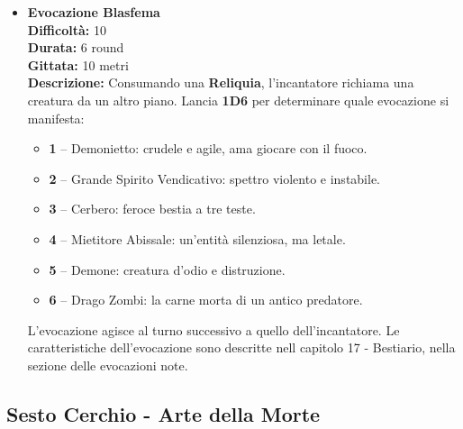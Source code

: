 \documentclass[./magie.tex]{subfiles}
\begin{document}
\begin{itemize}
\vspace{0.5cm}\rule{\textwidth}{0.4pt}\vspace{1cm}

\item \textbf{Evocazione Blasfema} \\
\textbf{Difficoltà:} 10 \\
\textbf{Durata:} 6 round \\
\textbf{Gittata:} 10 metri \\
\textbf{Descrizione:} Consumando una \textbf{Reliquia}, l’incantatore richiama una creatura da un altro piano. Lancia \textbf{1D6} per determinare quale evocazione si manifesta:
\begin{itemize}
\item \textbf{1} – Demonietto: crudele e agile, ama giocare con il fuoco.
\item \textbf{2} – Grande Spirito Vendicativo: spettro violento e instabile.
\item \textbf{3} – Cerbero: feroce bestia a tre teste.
\item \textbf{4} – Mietitore Abissale: un'entità silenziosa, ma letale.
\item \textbf{5} – Demone: creatura d’odio e distruzione.
\item \textbf{6} – Drago Zombi: la carne morta di un antico predatore.
\end{itemize}
L'evocazione agisce al turno successivo a quello dell'incantatore. Le caratteristiche dell'evocazione sono descritte nell capitolo 17 - Bestiario, nella sezione delle evocazioni note.
\end{itemize}


\clearpage
 \subsection*{Sesto Cerchio - Arte della Morte}
\end{document}

